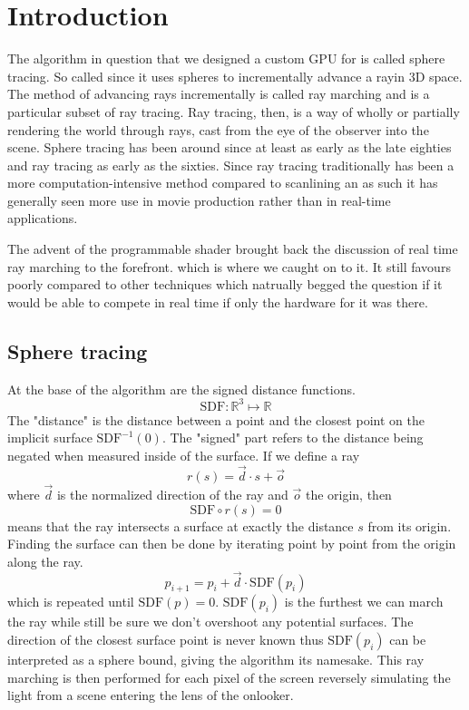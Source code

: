 \chapter{Introduction} 

The algorithm in question that we designed a custom GPU for is called sphere
tracing.\cite{Hart1996} So called since it uses spheres to incrementally
advance a ray\footnotemark in 3D space. The method of advancing rays
incrementally is called ray marching and is a particular subset of ray
tracing.\cite{Whitted1980} Ray tracing, then, is a way of wholly or partially
rendering the world through rays, cast from the eye of the observer into the
scene.  Sphere tracing has been around since at least as early as the late
eighties and ray tracing as early as the sixties.\cite{Hart1989,Appel1968}
Since ray tracing traditionally has been a more computation-intensive method
compared to scanlining\cite{Wylie1967} an as such it has generally seen more
use in movie production rather than in real-time applications.\cite{ref_needed?} 


The advent of the programmable shader brought back the discussion of real time
ray marching to the forefront. which is where we caught on to it.
\cite{JamieWong2016} It still favours poorly compared to other techniques which
natrually begged the question if it would be able to compete in real time if
only the hardware for it was there.


\section{Sphere tracing} 

At the base of the algorithm are the signed distance functions.
$$\text{SDF}:\mathbb{R}^{3}\mapsto\mathbb{R}$$ The "distance" is the distance
between a point and the closest point on the implicit surface
$\text{SDF}^{-1}(0)$. The "signed" part refers to the distance being negated
when measured inside of the surface.  If we define a ray $$r(s) = \vec{d} \cdot
s + \vec{o}$$ where $\vec{d}$ is the normalized direction of the ray and
$\vec{o}$ the origin, then $$\text{SDF}\circ r(s) = 0$$ means that the ray
intersects a surface at exactly the distance $s$ from its origin. Finding the
surface can then be done by iterating point by point from the origin along the
ray. $$p_{i+1} = p_i + \vec{d}\cdot \text{SDF}(p_i)$$ which is repeated until
$\text{SDF}(p) = 0$. $\text{SDF}(p_i)$ is the furthest we can march the ray
while still be sure we don't overshoot any potential surfaces. The direction of
the closest surface point is never known thus $\text{SDF}(p_i)$ can be
interpreted as a sphere bound, giving the algorithm its namesake. This ray
marching is then performed for each pixel of the screen reversely simulating
the light from a scene entering the lens of the onlooker.
	
